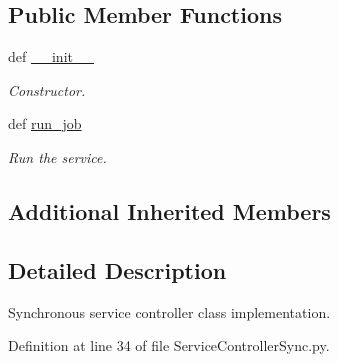\subsection*{Public Member Functions}
\begin{DoxyCompactItemize}
\item 
def \hyperlink{classRappCloud_1_1ServiceController_1_1ServiceControllerSync_1_1ServiceControllerSync_a0212f1505d44ae8957ec70e5677ba433}{\-\_\-\-\_\-init\-\_\-\-\_\-}
\begin{DoxyCompactList}\small\item\em Constructor. \end{DoxyCompactList}\item 
def \hyperlink{classRappCloud_1_1ServiceController_1_1ServiceControllerSync_1_1ServiceControllerSync_a56f7907b0d4c4887dd84a1047036168b}{run\-\_\-job}
\begin{DoxyCompactList}\small\item\em Run the service. \end{DoxyCompactList}\end{DoxyCompactItemize}
\subsection*{Additional Inherited Members}


\subsection{Detailed Description}
\begin{DoxyVerb}Synchronous service controller class implementation. \end{DoxyVerb}
 

Definition at line 34 of file Service\-Controller\-Sync.\-py.



